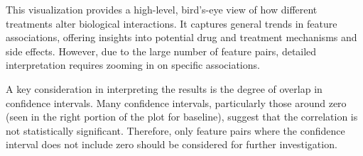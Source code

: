 \documentclass{report}
\begin{document}
    This visualization provides a high-level, bird's-eye view of how different treatments alter biological interactions. It captures general trends in feature associations, offering insights into potential drug and treatment mechanisms and side effects. However, due to the large number of feature pairs, detailed interpretation requires zooming in on specific associations.
    
    A key consideration in interpreting the results is the degree of overlap in confidence intervals. Many confidence intervals, particularly those around zero (seen in the right portion of the plot for baseline), suggest that the correlation is not statistically significant. Therefore, only feature pairs where the confidence interval does not include zero should be considered for further investigation.
\end{document}
